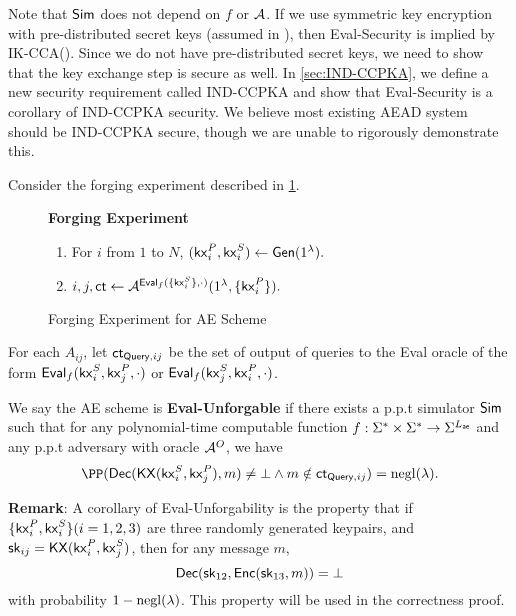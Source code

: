 Note that $\mathsf{Sim}$ does not depend on $f$ or $\mathcal{A}$. If we use symmetric key encryption with pre-distributed secret keys (assumed in \cite{angel2016unobservable}), then Eval-Security is implied by IK-CCA(\cite[Definition 1]{BBDP01keyprivate}). Since we do not have pre-distributed secret keys, we need to show that the key exchange step is secure as well. In \cref{sec:IND-CCPKA}, we define a new security requirement called IND-CCPKA  and show that Eval-Security is a corollary of IND-CCPKA security. We believe most existing AEAD system should be IND-CCPKA secure, though we are unable to rigorously demonstrate this.

\begin{definition}
\label{defn:AE-unforgability}
Consider the forging experiment described in \cref{expr:AE-forging}.

\begin{figure}[h!]
\begin{framed}
\textbf{Forging Experiment}
\begin{enumerate}
    \item For $i$ from $1$ to $N$, $(\mathsf{kx}_i^P, \mathsf{kx}_i^S) \leftarrow \mathsf{Gen}(1^{\lambda}).$
    \item $i, j, \mathsf{ct} \leftarrow \mathcal{A}^{\mathsf{Eval}_f(\{\mathsf{kx}_i^S\}, \cdot)}(1^{\lambda}, \{\mathsf{kx}_i^P\}).$
\end{enumerate}
\end{framed}
\caption{Forging Experiment for AE Scheme}
\label{expr:AE-forging}
\end{figure}

For each $A_{ij}$, let $\mathsf{ct}_{\mathsf{Query}, ij}$ be the set of output of queries to the Eval oracle of the form $\mathsf{Eval}_f(\mathsf{kx}_i^S, \mathsf{kx}_j^P, \cdot)$ or $\mathsf{Eval}_f(\mathsf{kx}_j^S, \mathsf{kx}_i^P, \cdot)$.

We say the AE scheme is \textbf{Eval-Unforgable} if there exists a p.p.t simulator $\mathsf{Sim}$ such that for any polynomial-time computable function $f: \Sigma^* \times \Sigma^* \to \Sigma^{L_{\mathsf{ae}}}$ and any p.p.t adversary with oracle $\mathcal{A}^O$, we have
$$\PP(\dec(\KX(\kx_i^S, \kx_j^P), m) \neq \bot \land m \notin \ct_{\query, ij}) = \negl(\lambda).$$
\end{definition}

\textbf{Remark}: A corollary of Eval-Unforgability is the property that if $\{\mathsf{kx}_i^{P}, \mathsf{kx}_i^{S}\}(i = 1,2,3)$ are three randomly generated keypairs, and ${\mathsf{sk}}_{ij} = \mathsf{KX}(\mathsf{kx}_i^P, \mathsf{kx}_j^S)$, then for any message $m$, 
$$\mathsf{Dec}({\mathsf{sk}}_{12}, \mathsf{Enc}({\mathsf{sk}}_{13}, m)) = \bot$$ 
with probability $1 - \operatorname{negl}(\lambda)$. This property will be used in the correctness proof.
